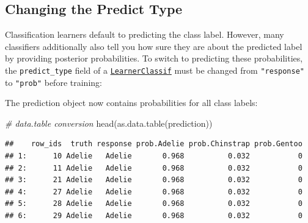 \documentclass[
]{scrbook}
\newenvironment{Shaded}{\begin{snugshade}}{\end{snugshade}}
\newcommand{\AttributeTok}[1]{\textcolor[rgb]{0.77,0.63,0.00}{#1}}
\newcommand{\CommentTok}[1]{\textcolor[rgb]{0.56,0.35,0.01}{\textit{#1}}}
\newcommand{\FunctionTok}[1]{\textcolor[rgb]{0.00,0.00,0.00}{#1}}
\newcommand{\NormalTok}[1]{#1}
\newcommand{\OtherTok}[1]{\textcolor[rgb]{0.56,0.35,0.01}{#1}}
\newcommand{\SpecialCharTok}[1]{\textcolor[rgb]{0.00,0.00,0.00}{#1}}
\newcommand{\StringTok}[1]{\textcolor[rgb]{0.31,0.60,0.02}{#1}}
\renewenvironment{Shaded} {\begin{snugshade}\small} {\end{snugshade}}
\begin{document}
\hypertarget{predict-type}{%
\subsection{Changing the Predict Type}\label{predict-type}}

Classification learners default to predicting the class label.
However, many classifiers additionally also tell you how sure they are about the predicted label by providing posterior probabilities.
To switch to predicting these probabilities, the \texttt{predict\_type} field of a \href{https://mlr3.mlr-org.com/reference/LearnerClassif.html}{\texttt{LearnerClassif}} must be changed from \texttt{"response"} to \texttt{"prob"} before training:

\begin{Shaded}
\end{Shaded}

The prediction object now contains probabilities for all class labels:

\begin{Shaded}
\begin{Highlighting}[]
\CommentTok{\# data.table conversion}
\FunctionTok{head}\NormalTok{(}\FunctionTok{as.data.table}\NormalTok{(prediction))}
\end{Highlighting}
\end{Shaded}

\begin{verbatim}
##    row_ids  truth response prob.Adelie prob.Chinstrap prob.Gentoo
## 1:      10 Adelie   Adelie       0.968          0.032           0
## 2:      11 Adelie   Adelie       0.968          0.032           0
## 3:      21 Adelie   Adelie       0.968          0.032           0
## 4:      27 Adelie   Adelie       0.968          0.032           0
## 5:      28 Adelie   Adelie       0.968          0.032           0
## 6:      29 Adelie   Adelie       0.968          0.032           0
\end{verbatim}
\end{document}
